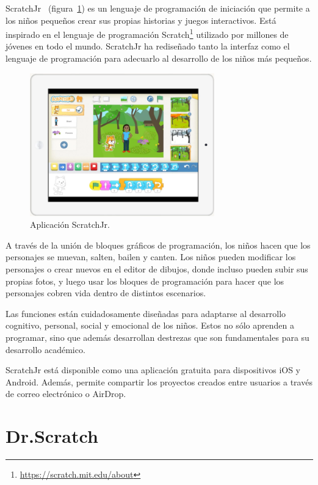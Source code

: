 \documentclass[a4paper, 12pt]{book}
\begin{document}
ScratchJr~\cite{scratchjr,leidl2017programming} (figura~\ref{fig:scratchjr}) es un lenguaje de programación de iniciación que permite a los niños pequeños crear sus propias historias y juegos interactivos.
Está inspirado en el lenguaje de programación Scratch\footnote{\url{https://scratch.mit.edu/about}} utilizado por millones de jóvenes en todo el mundo.
ScratchJr ha rediseñado tanto la interfaz como el lenguaje de programación para adecuarlo al desarrollo de los niños más pequeños.

\begin{figure}[ht]
  \centering
  \includegraphics[width=8cm, keepaspectratio]{img/scratchjr.png}
  \caption{Aplicación ScratchJr.}\label{fig:scratchjr}
\end{figure}

\vspace{5mm}
A través de la unión de bloques gráficos de programación, los niños hacen que los personajes se muevan, salten, bailen y canten.
Los niños pueden modificar los personajes o crear nuevos en el editor de dibujos, donde incluso pueden subir sus propias fotos, y luego usar los bloques de programación para hacer que los personajes cobren vida dentro de distintos escenarios.

\vspace{5mm}
Las funciones están cuidadosamente diseñadas para adaptarse al desarrollo cognitivo, personal, social y emocional de los niños.
Estos no sólo aprenden a programar, sino que además desarrollan destrezas que son fundamentales para su desarrollo académico.

\vspace{5mm}
ScratchJr está disponible como una aplicación gratuita para dispositivos iOS y Android.
Además, permite compartir los proyectos creados entre usuarios a través de correo electrónico o AirDrop.

\section{Dr.Scratch}
\label{sec:drscratch}
\end{document}
